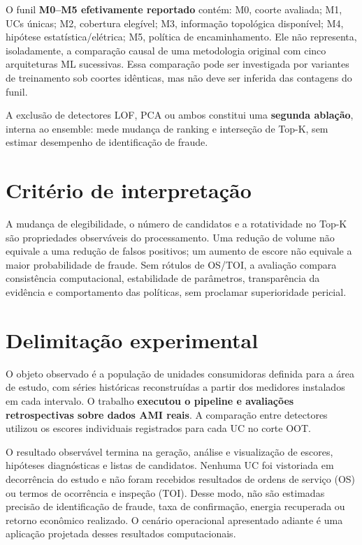 O funil \textbf{M0--M5 efetivamente reportado} contém: M0, coorte avaliada; M1, UCs únicas; M2, cobertura elegível; M3, informação topológica disponível; M4, hipótese estatística/elétrica; M5, política de encaminhamento. Ele não representa, isoladamente, a comparação causal de uma metodologia original com cinco arquiteturas ML sucessivas. Essa comparação pode ser investigada por variantes de treinamento sob coortes idênticas, mas não deve ser inferida das contagens do funil.

A exclusão de detectores LOF, PCA ou ambos constitui uma \textbf{segunda ablação}, interna ao ensemble: mede mudança de ranking e interseção de Top-K, sem estimar desempenho de identificação de fraude.

\section{Critério de interpretação}\label{crituxe9rio-de-interpretauxe7uxe3o}

A mudança de elegibilidade, o número de candidatos e a rotatividade no Top-K são propriedades observáveis do processamento. Uma redução de volume não equivale a uma redução de falsos positivos; um aumento de escore não equivale a maior probabilidade de fraude. Sem rótulos de OS/TOI, a avaliação compara consistência computacional, estabilidade de parâmetros, transparência da evidência e comportamento das políticas, sem proclamar superioridade pericial.

\section{Delimitação experimental}\label{delimitacao-experimental}

O objeto observado é a população de unidades consumidoras definida para a área de estudo, com séries históricas reconstruídas a partir dos medidores instalados em cada intervalo. O trabalho \textbf{executou o pipeline e avaliações retrospectivas sobre dados AMI reais}. A comparação entre detectores utilizou os escores individuais registrados para cada UC no corte OOT.

O resultado observável termina na geração, análise e visualização de escores, hipóteses diagnósticas e listas de candidatos. Nenhuma UC foi vistoriada em decorrência do estudo e não foram recebidos resultados de ordens de serviço (OS) ou termos de ocorrência e inspeção (TOI). Desse modo, não são estimadas precisão de identificação de fraude, taxa de confirmação, energia recuperada ou retorno econômico realizado. O cenário operacional apresentado adiante é uma aplicação projetada desses resultados computacionais.
